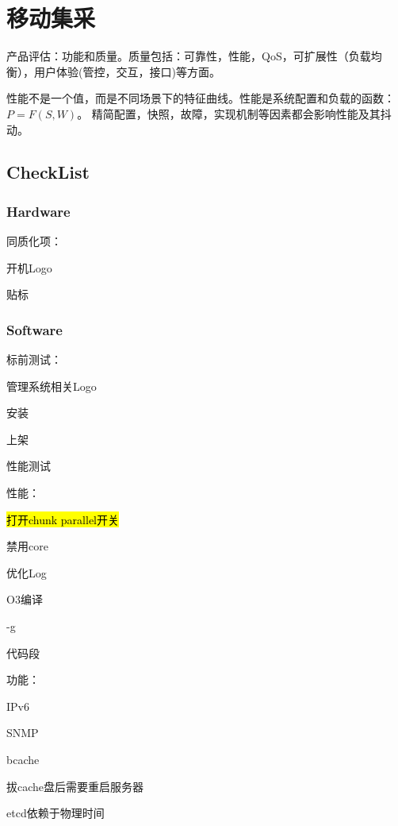 \chapter{移动集采}

产品评估：功能和质量。质量包括：可靠性，性能，QoS，可扩展性（负载均衡），用户体验(管控，交互，接口)等方面。

性能不是一个值，而是不同场景下的特征曲线。性能是系统配置和负载的函数：$P=F(S, W)$。
精简配置，快照，故障，实现机制等因素都会影响性能及其抖动。

\section{CheckList}

\subsection{Hardware}

同质化项：
\begin{enumbox}
\item 开机Logo
\item 贴标
\end{enumbox}

\subsection{Software}

标前测试：
\begin{enumbox}
\item 管理系统相关Logo
\item 安装
\item 上架
\item 性能测试
\end{enumbox}

性能：
\begin{enumbox}
\item \hl{打开chunk parallel开关}
\item 禁用core
\item 优化Log
\item O3编译
\item -g
\item 代码段
\end{enumbox}

功能：
\begin{enumbox}
\item IPv6
\item SNMP
\item bcache
\item 拔cache盘后需要重启服务器
\item etcd依赖于物理时间
\end{enumbox}

